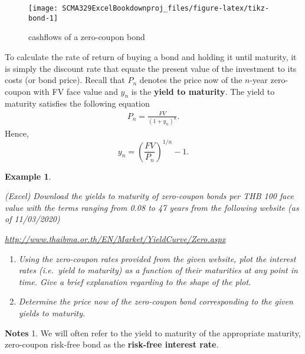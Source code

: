 \documentclass[
]{article}
\theoremstyle{definition}
\theoremstyle{definition}
\newtheorem{example}{Example}[section]
\theoremstyle{definition}
\theoremstyle{definition}
\theoremstyle{remark}
\begin{document}
\begin{figure}

{\centering \texttt{[image: SCMA329ExcelBookdownproj\_files/figure-latex/tikz-bond-1]} 

}

\caption{cashflows of a zero-coupon bond}\label{fig:tikz-bond}
\end{figure}

To calculate the rate of return of buying a bond and holding it until
maturity, it is simply the discount rate that equate the present value
of the investment to its costs (or bond price). Recall that \(P_n\)
denotes the price now of the \(n\)-year zero-coupon with FV face value and
\(y_n\) is the \textbf{yield to maturity}. The yield to maturity satisfies the
following equation \[\begin{aligned}
    P_n = \frac{FV}{(1+y_n)^n}.\end{aligned}\] Hence,
\[y_n = \left(\frac{FV}{P_n}\right)^{1/n} - 1.\]

\begin{example}
\protect\hypertarget{exm:yieldCurve}{}\label{exm:yieldCurve}

\emph{(Excel) Download the yields to maturity of zero-coupon
bonds per THB 100 face value with the terms ranging from 0.08 to 47
years from the following website (as of 11/03/2020)}

\emph{\url{http://www.thaibma.or.th/EN/Market/YieldCurve/Zero.aspx}}

\begin{enumerate}
\def\labelenumi{\arabic{enumi}.}
\item
  \emph{Using the zero-coupon rates provided from the given website, plot
  the interest rates (i.e.~yield to maturity) as a function of their
  maturities at any point in time. Give a brief explanation regarding
  to the shape of the plot.}
\item
  \emph{Determine the price now of the zero-coupon bond corresponding to
  the given yields to maturity.}
\end{enumerate}

\end{example}

\textbf{Notes}
1. We will often refer to the yield to maturity of the appropriate
maturity, zero-coupon risk-free bond as the \textbf{risk-free interest
rate}.
\end{document}
